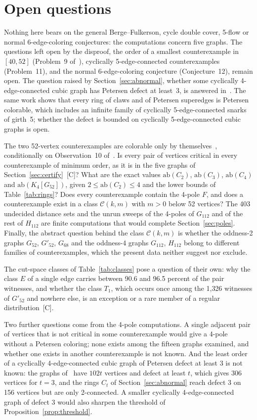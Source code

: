 \documentclass[11pt]{article}
\theoremstyle{definition}
\theoremstyle{remark}
\newcommand{\Gmain}{G_{112}}
\newcommand{\Gsym}{H_{112}}
\newcommand{\Gfty}{G_{52}}
\newcommand{\Gftyb}{G'_{52}}
\newcommand{\Gsix}{G_{68}}
\newcommand{\ab}{\mathrm{ab}}
\newcommand{\cj}{\textup{[C]}}
\begin{document}
\section{Open questions}\label{sec:open}

Nothing here bears on the general Berge--Fulkerson, cycle double cover, 5-flow or normal
6-edge-coloring conjectures: the computations concern five graphs. The questions left open by the
disproof, the order of a smallest counterexample in $[40, 52]$ (Problem~9 of~\cite{GJMMMU2026}),
cyclically 5-edge-connected counterexamples (Problem~11), and the normal 6-edge-coloring
conjecture (Conjecture~12), remain open. The question raised by Section~\ref{sec:abnormal}, whether
some cyclically 4-edge-connected cubic graph has Petersen defect at least~3, is answered
in~\cite{UD2026}. The same work shows that every ring of claws and of Petersen superedges is
Petersen colorable, which includes an infinite family of cyclically 5-edge-connected snarks of
girth~5; whether the defect is bounded on cyclically 5-edge-connected cubic graphs is open.

The two 52-vertex counterexamples are colorable only by themselves~\cite{COBI2026}, conditionally on
Observation~10 of~\cite{GJMMMU2026}. Is every pair of vertices critical in every counterexample of
minimum order, as it is in the five graphs of Section~\ref{sec:certify}~\cj{}? What are the exact values
$\ab(C_2)$, $\ab(C_3)$, $\ab(C_4)$ and $\ab(K_4[\Gfty])$, given $2 \le \ab(C_2) \le 4$ and the lower
bounds of Table~\ref{tab:rings}? Does every counterexample contain the 4-pole $F$, and does a
counterexample exist in a class $\mathcal C(k,m)$ with $m > 0$ below 52 vertices? The 403 undecided
distance sets and the unrun sweeps of the 4-poles of $\Gmain$ and of the rest of $\Gsym$ are finite
computations that would complete Section~\ref{sec:poles}. Finally, the abstract question behind the
class $\mathcal C(k,m)$ is whether the oddness-2 graphs $\Gfty$, $\Gftyb$, $\Gsix$ and the
oddness-4 graphs $\Gmain$, $\Gsym$ belong to different families of counterexamples, which the
present data neither suggest nor exclude.

The cut-space classes of Table~\ref{tab:classes} pose a question of their own: why the class $E$ of a
single edge carries between 90.6 and 96.5 percent of the pair witnesses, and whether the class $T_1$,
which occurs once among the 1{,}326 witnesses of $\Gftyb$ and nowhere else, is an exception or a
rare member of a regular distribution~\cj{}.

Two further questions come from the 4-pole computations. A single adjacent pair of vertices that is
not critical in some counterexample would give a 4-pole without a Petersen coloring; none exists among
the fifteen graphs examined, and whether one exists in another counterexample is not known. And the
least order of a cyclically 4-edge-connected cubic graph of Petersen defect at least 3 is not known:
the graphs of~\cite{UD2026} have $102t$ vertices and defect at least $t$, which gives 306 vertices for
$t = 3$, and the rings $C_t$ of Section~\ref{sec:abnormal} reach defect 3 on 156 vertices but are only
2-connected. A smaller cyclically 4-edge-connected graph of defect 3 would also sharpen the
threshold of Proposition~\ref{prop:threshold}.
\end{document}
